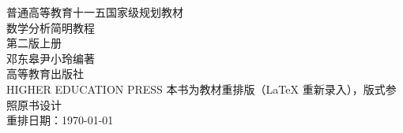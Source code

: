 \documentclass{dengbook}
\makeatletter
\let\hspace\@gobble
\makeatother
\begin{document}
\frontmatter
\pagestyle{empty}

\begin{titlepage}
  \centering
  \vspace*{2.2cm}
  {\headfont 普\hspace{0.3em}通\hspace{0.3em}高\hspace{0.3em}等\hspace{0.3em}教\hspace{0.3em}育\hspace{0.3em}十\hspace{0.3em}一\hspace{0.3em}五\hspace{0.3em}国\hspace{0.3em}家\hspace{0.3em}级\hspace{0.3em}规\hspace{0.3em}划\hspace{0.3em}教\hspace{0.3em}材}\\[3cm]
  {\headfont 数学分析简明教程}\\[1.2cm]
  {\headfont 第二版\hspace{2em}上册}\\[2.5cm]
  {\songfont 邓东皋\hspace{1em}尹小玲\hspace{1em}编著}\\[4cm]
  {\headfont 高等教育出版社}\\[0.4cm]
  {\small HIGHER EDUCATION PRESS}
  \vfill
  {\small 本书为教材重排版（LaTeX 重新录入），版式参照原书设计}\\
  {\small 重排日期：\today}
\end{titlepage}



\makeatletter
\renewcommand{\contentsname}{目\hspace{2em}录}
\makeatother
\begingroup
\pagestyle{empty}
\tableofcontents
\clearpage
\endgroup

\mainmatter
\pagestyle{fancy}









\end{document}
